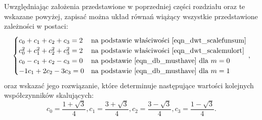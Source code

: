 Uwzględniając założenia przedstawione w poprzedniej części rozdziału oraz te wskazane powyżej, zapisać można układ równań wiążący wszystkie przedstawione zależności w postaci:
\begin{equation}
\begin{cases}
	c_0 + c_1 + c_2 + c_3 = 2         & $na podstawie właściwości \eqref{eqn_dwt_scalefunsum}$ \\
	c_0^2 + c_1^2 + c_2^2 + c_3^2 = 2 & $na podstawie właściwości \eqref{eqn_dwt_scalemulort}$ \\
	c_0 - c_1 + c_2 - c_3 = 0         & $na podstawie \eqref{eqn_db_musthave} dla $ m = 0 \\
	- 1 c_1 + 2 c_2 - 3 c_3 = 0       & $na podstawie \eqref{eqn_db_musthave} dla $ m = 1
\end{cases}
\label{eqn_db2_system},
\end{equation}
oraz wskazać jego rozwiązanie, które determinuje następujące wartości kolejnych współczynników skalujących:
\begin{equation}
c_0 = \frac{1 + \sqrt{3}}{4}, c_1 = \frac{3 + \sqrt{3}}{4}, c_2 = \frac{3 - \sqrt{3}}{4}, c_3 = \frac{1 - \sqrt{3}}{4} \label{eqn_db2_coefs}.
\end{equation}

